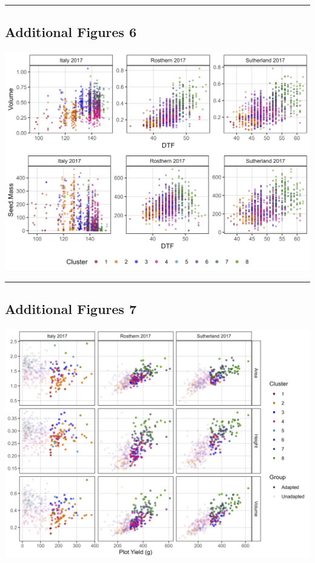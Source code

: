\documentclass[
]{article}
\begin{document}
\begin{center}\rule{0.5\linewidth}{0.5pt}\end{center}

\subsection{Additional Figures 6}\label{additional-figures-6}

\includegraphics{Additional/Additional_Figure_06.png}

\begin{center}\rule{0.5\linewidth}{0.5pt}\end{center}

\subsection{Additional Figures 7}\label{additional-figures-7}

\includegraphics{Additional/Additional_Figure_07.png}
\end{document}
